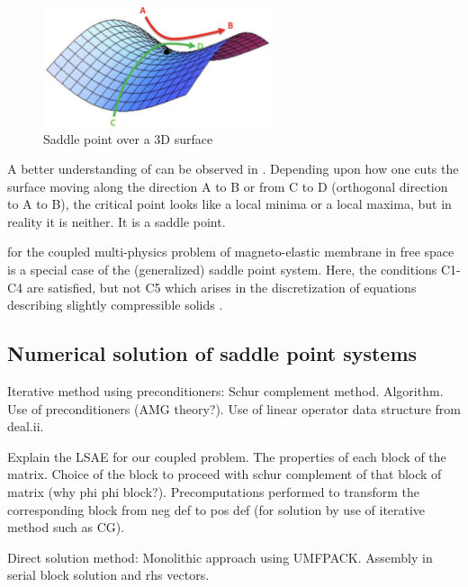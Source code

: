 \documentclass[11pt,a4paper,final]{article}
\begin{document}
\begin{figure}[h]
\centering
\includegraphics[width=0.6\textwidth]{saddle_point_problem.png}
\caption{Saddle point over a 3D surface \cite{Buduma_book}}
\label{fig:3.1}
\end{figure}

A better understanding of  can be observed in . Depending upon how one cuts the surface moving along the direction A to B or from C to D (orthogonal direction to A to B), the critical point looks like a local minima or a local maxima, but in reality it is neither. It is a saddle point. \par 

 for the coupled multi-physics problem of magneto-elastic membrane in free space is a special case of the (generalized) saddle point system. Here, the conditions C1-C4 are satisfied, but not C5 which arises in the discretization of equations describing slightly compressible solids \cite{Benzi2005}.

\subsection{Numerical solution of saddle point systems}
Iterative method using preconditioners: Schur complement method. Algorithm. Use of preconditioners (AMG theory?). Use of linear operator data structure from deal.ii. \par 

Explain the LSAE for our coupled problem. The properties of each block of the matrix. Choice of the block to proceed with schur complement of that block of matrix (why phi phi block?). Precomputations performed to transform the corresponding block from neg def to pos def (for solution by use of iterative method such as CG). \par 

Direct solution method: Monolithic approach using UMFPACK. Assembly in serial block solution and rhs vectors. 
\end{document}
